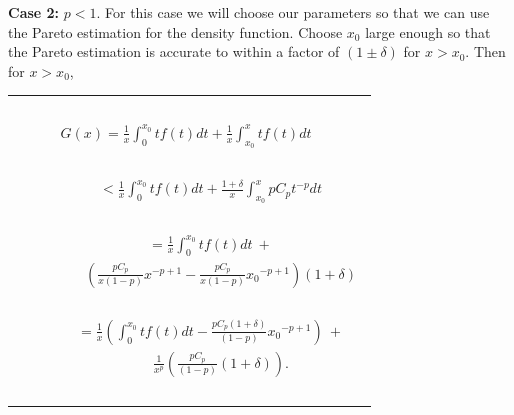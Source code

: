 \documentclass[12pt]{article}
\begin{document}
{\noindent \bf Case 2:} $p<1$. For this case we will choose our parameters
so that we can use the Pareto estimation for the density function.  Choose
$x_0$ large enough so that the Pareto estimation is accurate to within a
factor of $(1\pm\delta)$ for $x>x_0$.  Then for $x>x_0$,

\begin{tabular}{c}
\hfill~\\
$G(x) =
\frac{1}{x}\int_0^{x_0}tf(t)dt+\frac{1}{x}\int_{x_0}^xtf(t)dt$\hfill~\\
\hfill~\\
~~~~~~~$<\frac{1}{x}\int_0^{x_0}tf(t)dt+\frac{1+\delta}{x}\int_{x_0}^xpC_pt^{-p}dt$\hfill~\\
\hfill~\\
~~~~~~~$=\frac{1}{x}\int_0^{x_0}tf(t)dt\ +$\hfill~\\
~~~~~~~~~~$(\frac{pC_p}{x(1-p)}x^{-p+1}-\frac{pC_p}{x(1-p)}{x_0}^{-p+1})(1+\delta)$\hfill~\\
\hfill~\\
~~~~~~~$=\frac{1}{x}(\int_0^{x_0}tf(t)dt-\frac{pC_p(1+\delta)}{(1-p)}{x_0}^{-p+1})\
+$\hfill~\\
~~~~~~~~~~$\frac{1}{x^p}(\frac{pC_p}{(1-p)}(1+\delta)).$\hfill~\\
\hfill~\\
\end{tabular}

\end{document}
